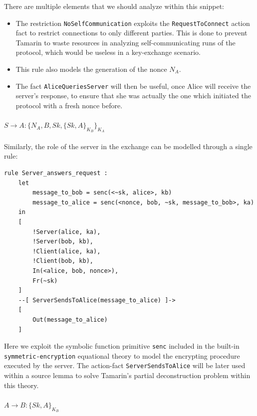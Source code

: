 \documentclass[fleqn,10pt]{SelfArx} %
\begin{document}
There are multiple elements that we should analyze within this snippet:

\begin{itemize}
    \item The restriction \lstinline|NoSelfCommunication| exploits the \lstinline|RequestToConnect| action fact to restrict connections to only different parties. This is done to prevent Tamarin to waste resources in analyzing self-communicating runs of the protocol, which would be useless in a key-exchange scenario.
    \item This rule also models the generation of the nonce $N_A$.
    \item The fact \lstinline|AliceQueriesServer| will then be useful, once Alice will receive the server's response, to ensure that she was actually the one which initiated the protocol with a fresh nonce before.
\end{itemize}

\paragraph{$S \to A: \{N_A, B, Sk, \{Sk, A\}_{K_B} \}_{K_A}$}

Similarly, the role of the server in the exchange can be modelled through a single rule:

\begin{lstlisting}[language=Tamarin]
rule Server_answers_request :
    let
        message_to_bob = senc(<~sk, alice>, kb)
        message_to_alice = senc(<nonce, bob, ~sk, message_to_bob>, ka)
    in
    [
        !Server(alice, ka),
        !Server(bob, kb),
        !Client(alice, ka),
        !Client(bob, kb),
        In(<alice, bob, nonce>),
        Fr(~sk)
    ]
    --[ ServerSendsToAlice(message_to_alice) ]->
    [
        Out(message_to_alice)
    ]
\end{lstlisting}

Here we exploit the symbolic function primitive \lstinline|senc| included in the built-in \lstinline|symmetric-encryption| equational theory to model the encrypting procedure executed by the server. The action-fact \lstinline|ServerSendsToAlice| will be later used within a source lemma to solve Tamarin's partial deconstruction problem within this theory.

\paragraph{$A \to B: \{Sk, A\}_{K_B}$}
\end{document}
